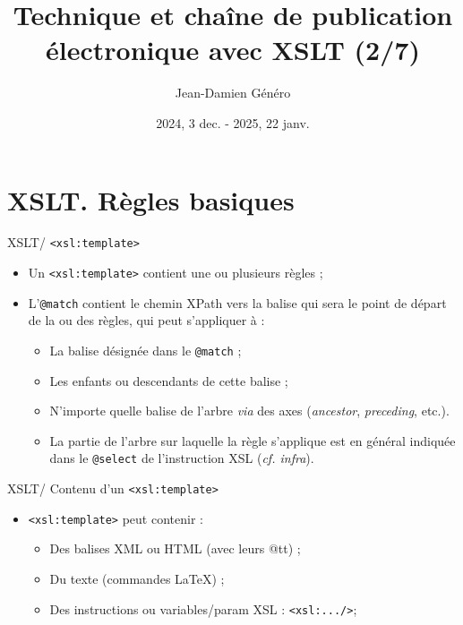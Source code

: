 \documentclass{beamer}
\title{Technique et chaîne de publication électronique avec XSLT (2/7)}
\date{2024, 3 dec. - 2025, 22 janv.}
\author{Jean-Damien Généro}
\institute{École nationale des chartes -- M2 TNAH}
\begin{document}
  \maketitle

  \section{XSLT. Règles basiques}

    \begin{frame}{XSLT/ \texttt{<xsl:template>}}
    \Large
        \begin{itemize}
            \item Un \texttt{<xsl:template>} contient une ou plusieurs règles ;
            \bigskip
            \item L'\texttt{@match} contient le chemin XPath vers la balise qui sera le point de départ de la ou des règles, qui peut s'appliquer à :
            \bigskip
            \begin{itemize}
            \large
                \item La balise désignée dans le \texttt{@match} ;
                \item Les enfants ou descendants de cette balise ;
                \item N'importe quelle balise de l'arbre \textit{via} des axes (\textit{ancestor}, \textit{preceding}, etc.).
                \bigskip
                \item La partie de l'arbre sur laquelle la règle s'applique est en général indiquée dans le \texttt{@select} de l'instruction XSL (\textit{cf. infra}). %
            \end{itemize}
        \end{itemize}
    \end{frame}

     \begin{frame}{XSLT/ Contenu d'un \texttt{<xsl:template>}}
         \Large
         \begin{itemize}
             \item \texttt{<xsl:template>} peut contenir :
             \begin{itemize}
             \Large
                 \item Des balises XML ou HTML (avec leurs @tt) ;
                 \item Du texte (commandes \LaTeX) ;
                 \item Des instructions ou variables/param XSL : \texttt{<xsl:.../>};
             \end{itemize}
         \end{itemize}
     \end{frame}
\end{document}
